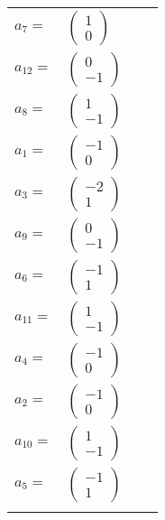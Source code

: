 \documentclass[1p]{elsarticle_modified}
\theoremstyle{definition}
\begin{document}
\begin{tabular}{m{7pt} m{180pt} m{7pt} m{180pt} }
\flushright $a_{7}=$&$\begin{pmatrix}1\\0\end{pmatrix}$ \\
\flushright $a_{12}=$&$\begin{pmatrix}0\\-1\end{pmatrix}$ \\
\flushright $a_{8}=$&$\begin{pmatrix}1\\-1\end{pmatrix}$ \\
\flushright $a_{1}=$&$\begin{pmatrix}-1\\0\end{pmatrix}$ \\
\flushright $a_{3}=$&$\begin{pmatrix}-2\\1\end{pmatrix}$ \\
\flushright $a_{9}=$&$\begin{pmatrix}0\\-1\end{pmatrix}$ \\
\flushright $a_{6}=$&$\begin{pmatrix}-1\\1\end{pmatrix}$ \\
\flushright $a_{11}=$&$\begin{pmatrix}1\\-1\end{pmatrix}$ \\
\flushright $a_{4}=$&$\begin{pmatrix}-1\\0\end{pmatrix}$ \\
\flushright $a_{2}=$&$\begin{pmatrix}-1\\0\end{pmatrix}$ \\
\flushright $a_{10}=$&$\begin{pmatrix}1\\-1\end{pmatrix}$ \\
\flushright $a_{5}=$&$\begin{pmatrix}-1\\1\end{pmatrix}$\\&\end{tabular}
\end{document}
